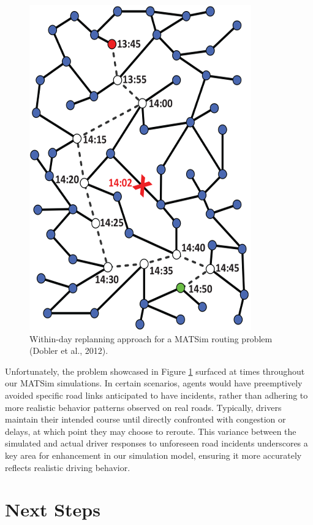 \documentclass[fancy, oneside, mastersfancy, ms]{byuthesis}
\begin{document}
\begin{figure}
\centering
\includegraphics{figures/within_day.png}
\caption[Within-day replanning approach for a MATSim routing problem.]{Within-day replanning approach for a MATSim routing problem (Dobler et al., 2012).}
\label{fig-within-day}
\end{figure}

Unfortunately, the problem showcased in Figure \ref{fig-within-day}
surfaced at times throughout our MATSim simulations. In certain
scenarios, agents would have preemptively avoided specific road links
anticipated to have incidents, rather than adhering to more realistic
behavior patterns observed on real roads. Typically, drivers maintain
their intended course until directly confronted with congestion or
delays, at which point they may choose to reroute. This variance between
the simulated and actual driver responses to unforeseen road incidents
underscores a key area for enhancement in our simulation model, ensuring
it more accurately reflects realistic driving behavior.

\hypertarget{sec-next_steps}{%
\section{Next Steps}\label{sec-next_steps}}
\end{document}
